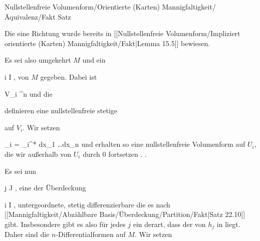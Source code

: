 {Nullstellenfreie Volumenform/Orientierte (Karten) Mannigfaltigkeit/Äquivalenz/Fakt}
{Satz}
{}
{

\faktzusatz {}

}
{

\teilbeweis {}{}{}
{Die eine Richtung wurde bereits
in [[Nullstellenfreie Volumenform/Impliziert orientierte (Karten) Mannigfaltigkeit/Fakt|Lemma 15.5]]
bewiesen.}
{}
\teilbeweis {}{}{}
{Es sei also umgekehrt $M$
und ein

 {}
 {i \in I} {}
 {} {} {} {,}
von $M$ gegeben. Dabei ist

\mavergleichskette
{\vergleichskette
{ V_i
}
{ \subseteq }{ \R^n
}
{  }{
}
{    }{
}
{   }{
}
}
{}{}{}
und die

 definieren eine nullstellenfreie stetige
 {} {}

 auf $V_i$. Wir setzen

\mavergleichskettedisp
{\vergleichskette
{ \omega_i
}
{ =} { \alpha_i^* dx_1 \wedge \ldots \wedge dx_n
}
{ } {
}
{ } {
}
{ } {
}
}
{}{}{}
und erhalten so eine nullstellenfreie Volumenform auf $U_i$, die wir außerhalb von $U_i$ durch $0$ fortsetzen {.} {.}

Es sei nun

 {}
 {j \in J} {}
 {} {} {} {,}
eine der Überdeckung

 {}
 {i \in I} {}
 {} {} {} {,}
untergeordnete, stetig differenzierbare
die es
nach [[Mannigfaltigkeit/Abzählbare Basis/Überdeckung/Partition/Fakt|Satz 22.10]]
gibt. Insbesondere gibt es also für jedes $j$ ein
 derart, dass der
von $h_j$ in
 liegt. Daher sind die
$n$-Differentialformen auf $M$. Wir setzen

}}
